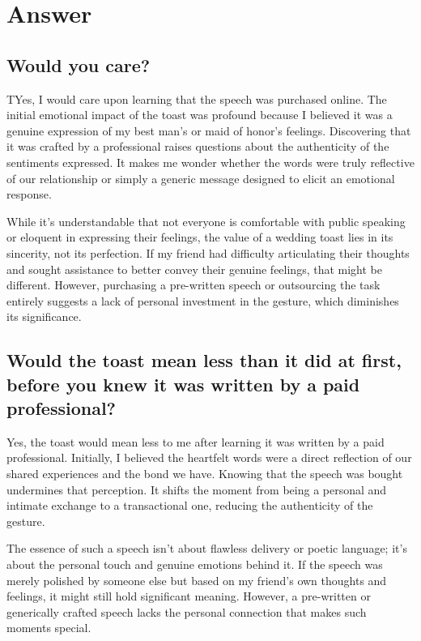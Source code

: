 \chapter{Answer}

\section{Would you care?}

TYes, I would care upon learning that the speech was purchased online. The initial emotional impact of the toast was profound because I believed it was a genuine expression of my best man's or maid of honor's feelings. Discovering that it was crafted by a professional raises questions about the authenticity of the sentiments expressed. It makes me wonder whether the words were truly reflective of our relationship or simply a generic message designed to elicit an emotional response.

While it's understandable that not everyone is comfortable with public speaking or eloquent in expressing their feelings, the value of a wedding toast lies in its sincerity, not its perfection. If my friend had difficulty articulating their thoughts and sought assistance to better convey their genuine feelings, that might be different. However, purchasing a pre-written speech or outsourcing the task entirely suggests a lack of personal investment in the gesture, which diminishes its significance.

\section{Would the toast mean less than it did at first, before you knew it was written by a paid professional?}

Yes, the toast would mean less to me after learning it was written by a paid professional. Initially, I believed the heartfelt words were a direct reflection of our shared experiences and the bond we have. Knowing that the speech was bought undermines that perception. It shifts the moment from being a personal and intimate exchange to a transactional one, reducing the authenticity of the gesture.

The essence of such a speech isn't about flawless delivery or poetic language; it's about the personal touch and genuine emotions behind it. If the speech was merely polished by someone else but based on my friend's own thoughts and feelings, it might still hold significant meaning. However, a pre-written or generically crafted speech lacks the personal connection that makes such moments special.
